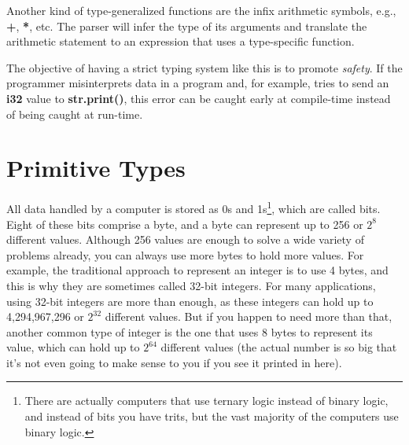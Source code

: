 \documentclass[11pt,fleqn,openany]{book} %
\begin{document}
Another kind of type-generalized functions are the infix arithmetic symbols, e.g., \textbf{+}, \textbf{*}, etc. The parser will infer the type of its arguments and translate the arithmetic statement to an expression that uses a type-specific function.

The objective of having a strict typing system like this is to promote \emph{safety}. If the programmer misinterprets data in a program and, for example, tries to send an \textbf{i32} value to \textbf{str.print()}, this error can be caught early at compile-time instead of being caught at run-time.


\section{Primitive Types}


All data handled by a computer is stored as 0s and 1s\footnote{There are actually computers that use ternary logic instead of binary logic, and instead of bits you have trits, but the vast majority of the computers use binary logic.}, which are called bits. Eight of these bits comprise a byte, and a byte can represent up to 256 or $2^8$ different values. Although 256 values are enough to solve a wide variety of problems already, you can always use more bytes to hold more values. For example, the traditional approach to represent an integer is to use 4 bytes, and this is why they are sometimes called 32-bit integers. For many applications, using 32-bit integers are more than enough, as these integers can hold up to 4,294,967,296 or $2^{32}$ different values. But if you happen to need more than that, another common type of integer is the one that uses 8 bytes to represent its value, which can hold up to $2^{64}$ different values (the actual number is so big that it's not even going to make sense to you if you see it printed in here).
\end{document}
